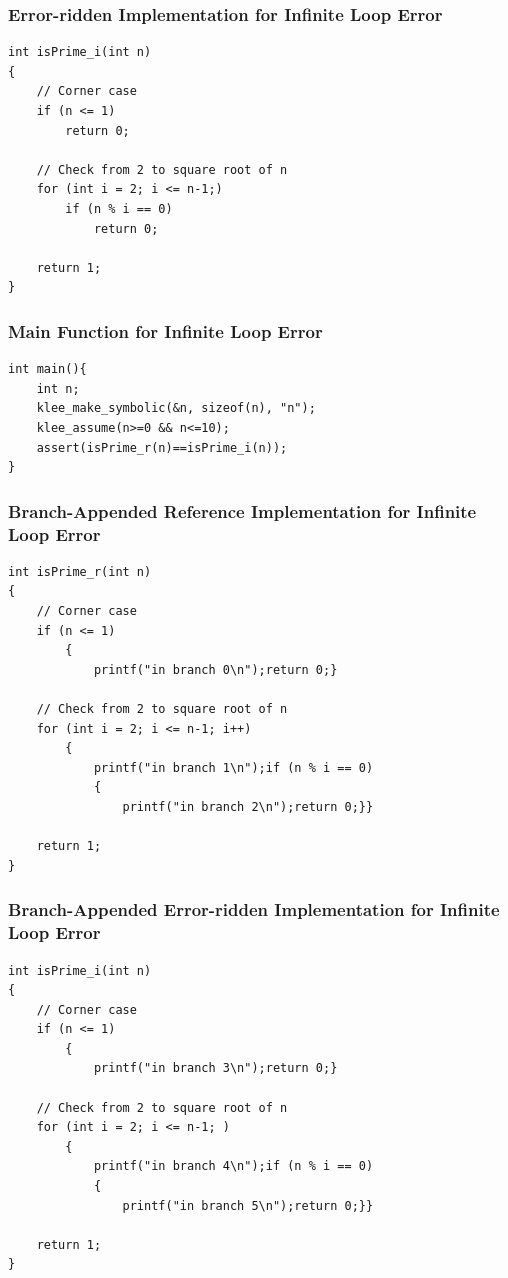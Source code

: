 \subsubsection{Error-ridden Implementation for Infinite Loop Error}
\begin{verbatim}
int isPrime_i(int n)
{
    // Corner case
    if (n <= 1)
        return 0;

    // Check from 2 to square root of n
    for (int i = 2; i <= n-1;)
        if (n % i == 0)
            return 0;

    return 1;
}

\end{verbatim}

\subsubsection{Main Function for Infinite Loop Error}
\begin{verbatim}
int main(){
    int n;
    klee_make_symbolic(&n, sizeof(n), "n");
    klee_assume(n>=0 && n<=10);
    assert(isPrime_r(n)==isPrime_i(n));
}
\end{verbatim}
\subsubsection{Branch-Appended Reference Implementation for Infinite Loop Error}
\begin{verbatim}
int isPrime_r(int n)
{
    // Corner case
    if (n <= 1)
        {
            printf("in branch 0\n");return 0;}

    // Check from 2 to square root of n
    for (int i = 2; i <= n-1; i++)
        {
            printf("in branch 1\n");if (n % i == 0)
            {
                printf("in branch 2\n");return 0;}}

    return 1;
}
\end{verbatim}

\subsubsection{Branch-Appended Error-ridden Implementation for Infinite Loop Error}

\begin{verbatim}
int isPrime_i(int n)
{
    // Corner case
    if (n <= 1)
        {
            printf("in branch 3\n");return 0;}

    // Check from 2 to square root of n
    for (int i = 2; i <= n-1; )
        {
            printf("in branch 4\n");if (n % i == 0)
            {
                printf("in branch 5\n");return 0;}}

    return 1;
}
\end{verbatim}
